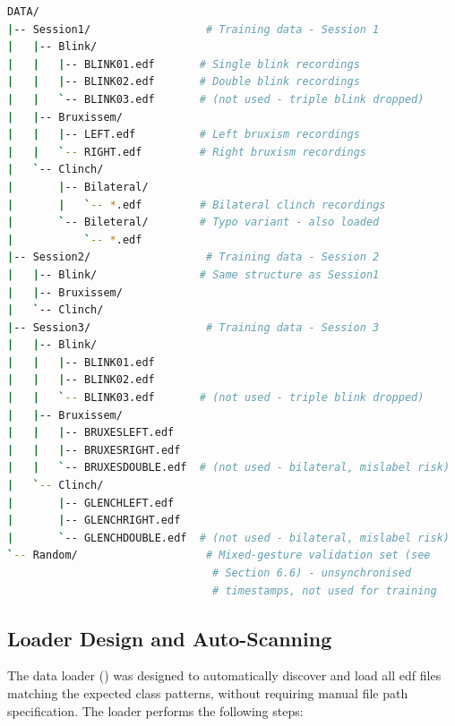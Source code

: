 \begin{lstlisting}[language=bash, caption={Dataset directory
structure. Session1 and Session2 share one file-naming
convention; Session3 uses a second convention (GLENCH*,
BRUXES*) that the loader normalises to the same class labels.
Each session contributes exactly 5 selected recordings (one per
final class) for 15 \acrshort{edf} recordings in total; the
*03/*DOUBLE files (triple blink, bilateral bruxism/clinch) are
present on disk but excluded from the final 5-class dataset.},
label={lst:dir_structure}]
DATA/
|-- Session1/                  # Training data - Session 1
|   |-- Blink/
|   |   |-- BLINK01.edf       # Single blink recordings
|   |   |-- BLINK02.edf       # Double blink recordings
|   |   `-- BLINK03.edf       # (not used - triple blink dropped)
|   |-- Bruxissem/
|   |   |-- LEFT.edf          # Left bruxism recordings
|   |   `-- RIGHT.edf         # Right bruxism recordings
|   `-- Clinch/
|       |-- Bilateral/
|       |   `-- *.edf         # Bilateral clinch recordings
|       `-- Bileteral/        # Typo variant - also loaded
|           `-- *.edf
|-- Session2/                  # Training data - Session 2
|   |-- Blink/                # Same structure as Session1
|   |-- Bruxissem/
|   `-- Clinch/
|-- Session3/                  # Training data - Session 3
|   |-- Blink/
|   |   |-- BLINK01.edf
|   |   |-- BLINK02.edf
|   |   `-- BLINK03.edf       # (not used - triple blink dropped)
|   |-- Bruxissem/
|   |   |-- BRUXESLEFT.edf
|   |   |-- BRUXESRIGHT.edf
|   |   `-- BRUXESDOUBLE.edf  # (not used - bilateral, mislabel risk)
|   `-- Clinch/
|       |-- GLENCHLEFT.edf
|       |-- GLENCHRIGHT.edf
|       `-- GLENCHDOUBLE.edf  # (not used - bilateral, mislabel risk)
`-- Random/                    # Mixed-gesture validation set (see
                                # Section 6.6) - unsynchronised
                                # timestamps, not used for training
\end{lstlisting}

\subsection{Loader Design and Auto-Scanning}

The data loader () was designed to automatically
discover and load all \acrshort{edf} files matching the expected
class patterns, without requiring manual file path specification.
The loader performs the following steps:

